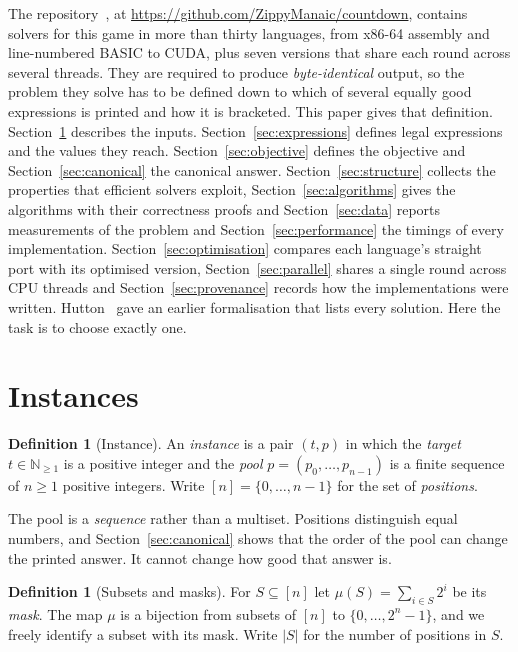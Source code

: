 \documentclass[11pt,a4paper]{article}
\theoremstyle{definition}
\newtheorem{definition}[theorem]{Definition}
\theoremstyle{remark}
\newcommand{\N}{\mathbb{N}}
\newcommand{\mask}{\mu}
\begin{document}
The repository~\cite{repo}, at \url{https://github.com/ZippyManaic/countdown}, contains solvers for this game in more than thirty languages, from x86-64 assembly and line-numbered
BASIC to CUDA, plus seven versions that share each round across several threads. They are required to produce \emph{byte-identical} output, so the problem they
solve has to be defined down to which of several equally good expressions is printed and how it is
bracketed. This paper gives that definition. Section~\ref{sec:instances} describes the inputs.
Section~\ref{sec:expressions} defines legal expressions and the values they reach.
Section~\ref{sec:objective} defines the objective and Section~\ref{sec:canonical} the canonical answer.
Section~\ref{sec:structure} collects the properties that efficient solvers exploit,
Section~\ref{sec:algorithms} gives the algorithms with their correctness proofs and
Section~\ref{sec:data} reports measurements of the problem and Section~\ref{sec:performance} the
timings of every implementation. Section~\ref{sec:optimisation} compares each language's straight port with
its optimised version, Section~\ref{sec:parallel} shares a single round across CPU threads and
Section~\ref{sec:provenance} records how the implementations were written. Hutton~\cite{hutton} gave an earlier formalisation that
lists every solution. Here the task is to choose exactly one.

\section{Instances}\label{sec:instances}

\begin{definition}[Instance]
An \emph{instance} is a pair $(t, p)$ in which the \emph{target} $t \in \N_{\ge 1}$ is a positive integer
and the \emph{pool} $p = (p_0, \dots, p_{n-1})$ is a finite sequence of $n \ge 1$ positive integers.
Write $[n] = \{0, \dots, n-1\}$ for the set of \emph{positions}.
\end{definition}

The pool is a \emph{sequence} rather than a multiset. Positions distinguish equal numbers, and
Section~\ref{sec:canonical} shows that the order of the pool can change the printed answer. It cannot change
how good that answer is.

\begin{definition}[Subsets and masks]
For $S \subseteq [n]$ let $\mask(S) = \sum_{i \in S} 2^i$ be its \emph{mask}. The map $\mask$ is a bijection
from subsets of $[n]$ to $\{0, \dots, 2^n - 1\}$, and we freely identify a subset with its mask. Write
$|S|$ for the number of positions in $S$.
\end{definition}
\end{document}
